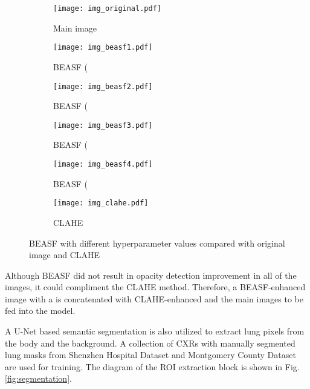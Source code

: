 \documentclass{article}
\begin{document}
\begin{figure}[H]
    \begin{subfigure}{0.3\linewidth}
        \centering
        \texttt{[image: img\_original.pdf]}
        \caption{Main image}
        \label{fig:img_original2}
    \end{subfigure}
    \hfill
    \begin{subfigure}{0.3\linewidth}
        \centering
        \texttt{[image: img\_beasf1.pdf]}
        \caption{BEASF (}
        \label{fig:img_beasf1}
    \end{subfigure}
    \hfill
    \begin{subfigure}{0.3\linewidth}
        \centering
        \texttt{[image: img\_beasf2.pdf]}
        \caption{BEASF (}
        \label{fig:img_beasf2}
    \end{subfigure}
    \hfill
    \begin{subfigure}{0.3\linewidth}
        \centering
        \texttt{[image: img\_beasf3.pdf]}
        \caption{BEASF (}
        \label{fig:img_beasf3}
    \end{subfigure}
    \hfill
    \begin{subfigure}{0.3\linewidth}
        \centering
        \texttt{[image: img\_beasf4.pdf]}
        \caption{BEASF (}
        \label{fig:img_beasf4}
    \end{subfigure}
    \hfill
    \begin{subfigure}{0.3\linewidth}
        \centering
        \texttt{[image: img\_clahe.pdf]}
        \caption{CLAHE}
        \label{fig:img_clahe2}
    \end{subfigure}
\caption{BEASF with different hyperparameter values compared with original image and CLAHE}
\label{fig:beasf_vs_clahe}
\end{figure}

\noindent Although BEASF did not result in opacity detection improvement in all of the images, it could compliment the CLAHE method. Therefore, a BEASF-enhanced image with a  is concatenated with CLAHE-enhanced and the main images to be fed into the model.

A U-Net based semantic segmentation \cite{ronneberger2015u} is also utilized to extract lung pixels from the body and the background. A collection of CXRs with manually segmented lung masks from Shenzhen Hospital Dataset \cite{stirenko2018chest} and Montgomery County Dataset \cite{candemir2013lung} are used for training. The diagram of the ROI extraction block is shown in Fig. \ref{fig:segmentation}.
\end{document}
